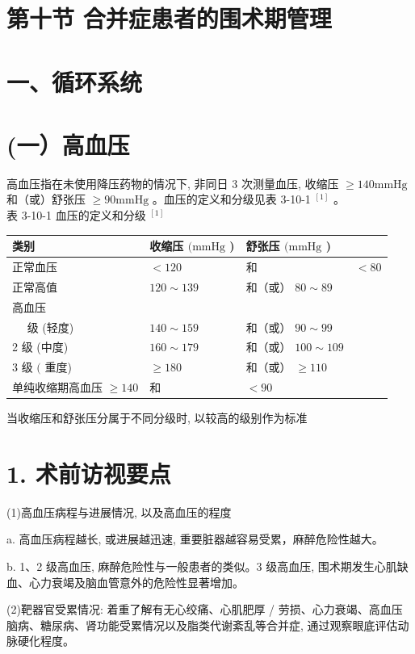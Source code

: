 \documentclass[10pt]{article}
\begin{document}
\section*{第十节 合并症患者的围术期管理}
\section*{一、循环系统}
\section*{(一）高血压}
高血压指在未使用降压药物的情况下, 非同日 3 次测量血压, 收缩压 $\geqslant 140 \mathrm{mmHg}$ 和（或）舒张压 $\geqslant 90 \mathrm{mmHg}$ 。血压的定义和分级见表 3-10-1 ${ }^{[1]}$ 。\\
表 3-10-1 血压的定义和分级 ${ }^{[1]}$

\begin{center}
\begin{tabular}{llll}
\hline
类别 & 收缩压 $(\mathrm{mmHg}$ ) & 舒张压 $(\mathrm{mmHg}$ ) &  \\
\hline
正常血压 & $<120$ & 和 & $<80$ \\
正常高值 & $120 \sim 139$ & 和（或） $80 \sim 89$ &  \\
高血压 &  &  &  \\
$\quad$ 级 (轻度) & $140 \sim 159$ & 和（或） $90 \sim 99$ &  \\
2 级 (中度) & $160 \sim 179$ & 和（或） $100 \sim 109$ &  \\
3 级 $($ 重度) & $\geqslant 180$ & 和（或） $\geqslant 110$ &  \\
单纯收缩期高血压 $\geqslant 140$ & 和 & $<90$ &  \\
\hline
\end{tabular}
\end{center}

当收缩压和舒张压分属于不同分级时, 以较高的级别作为标准

\section*{1. 术前访视要点}
(1)高血压病程与进展情况, 以及高血压的程度

a. 高血压病程越长, 或进展越迅速, 重要脏器越容易受累，麻醉危险性越大。

b. 1、2 级高血压, 麻醉危险性与一般患者的类似。3 级高血压, 围术期发生心肌缺血、心力衰竭及脑血管意外的危险性显著增加。

(2)靶器官受累情况: 着重了解有无心绞痛、心肌肥厚 / 劳损、心力衰竭、高血压脑病、糖尿病、肾功能受累情况以及脂类代谢紊乱等合并症, 通过观察眼底评估动脉硬化程度。
\end{document}
